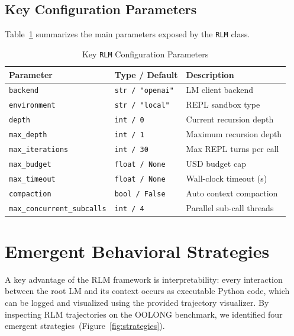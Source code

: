 \documentclass[journal, 10pt, letterpaper]{IEEEtran}
\newcommand{\code}[1]{\texttt{#1}}
\begin{document}
\subsection{Key Configuration Parameters}

Table~\ref{tab:params} summarizes the main parameters exposed by the
\code{RLM} class.

\begin{table}[!t]
  \caption{Key \code{RLM} Configuration Parameters}
  \label{tab:params}
  \centering
  \begin{tabularx}{\columnwidth}{l l X}
    \toprule
    \textbf{Parameter} & \textbf{Type / Default} & \textbf{Description} \\
    \midrule
    \code{backend}           & \code{str / "openai"} & LM client backend \\
    \code{environment}       & \code{str / "local"}  & REPL sandbox type \\
    \code{depth}             & \code{int / 0}        & Current recursion depth \\
    \code{max\_depth}        & \code{int / 1}        & Maximum recursion depth \\
    \code{max\_iterations}   & \code{int / 30}       & Max REPL turns per call \\
    \code{max\_budget}       & \code{float / None}   & USD budget cap \\
    \code{max\_timeout}      & \code{float / None}   & Wall-clock timeout (s) \\
    \code{compaction}        & \code{bool / False}   & Auto context compaction \\
    \code{max\_concurrent\_subcalls} & \code{int / 4} & Parallel sub-call threads \\
    \bottomrule
  \end{tabularx}
\end{table}

\section{Emergent Behavioral Strategies}
\label{sec:strategies}

A key advantage of the RLM framework is interpretability: every interaction
between the root LM and its context occurs as executable Python code, which
can be logged and visualized using the provided trajectory visualizer.  By
inspecting RLM trajectories on the OOLONG benchmark, we identified four
emergent strategies~(Figure~\ref{fig:strategies}).
\end{document}
